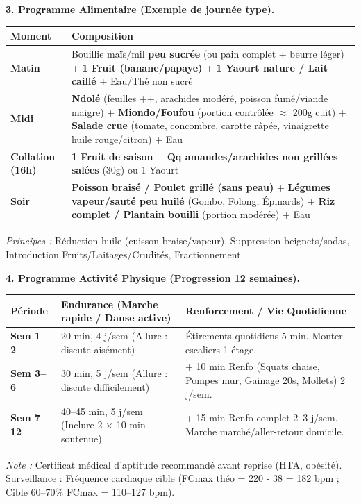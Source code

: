\documentclass[11pt]{article}
\begin{document}
\begin{exoresolu}
\textbf{3. Programme Alimentaire (Exemple de journée type).}
\begin{center}
\begin{tabularx}{\linewidth}{|l|X|}\hline
\rowcolor{popblueL} \textbf{Moment} & \textbf{Composition} \\ \hline
\textbf{Matin} & Bouillie maïs/mil \textbf{peu sucrée} (ou pain complet + beurre léger) + \textbf{1 Fruit (banane/papaye)} + \textbf{1 Yaourt nature / Lait caillé} + Eau/Thé non sucré \\ \hline
\textbf{Midi} & \textbf{Ndolé} (feuilles ++, arachides modéré, poisson fumé/viande maigre) + \textbf{Miondo/Foufou} (portion contrôlée $\approx$ 200g cuit) + \textbf{Salade crue} (tomate, concombre, carotte râpée, vinaigrette huile rouge/citron) + Eau \\ \hline
\textbf{Collation (16h)} & \textbf{1 Fruit de saison} + \textbf{Qq amandes/arachides non grillées salées} (30g) ou 1 Yaourt \\ \hline
\textbf{Soir} & \textbf{Poisson braisé / Poulet grillé (sans peau)} + \textbf{Légumes vapeur/sauté peu huilé} (Gombo, Folong, Épinards) + \textbf{Riz complet / Plantain bouilli} (portion modérée) + Eau \\ \hline
\end{tabularx}
\end{center}
\textit{Principes :} Réduction huile (cuisson braise/vapeur), Suppression beignets/sodas, Introduction Fruits/Laitages/Crudités, Fractionnement.

\textbf{4. Programme Activité Physique (Progression 12 semaines).}
\begin{center}
\begin{tabularx}{\linewidth}{|l|X|X|}\hline
\rowcolor{popblueL} \textbf{Période} & \textbf{Endurance (Marche rapide / Danse active)} & \textbf{Renforcement / Vie Quotidienne} \\ \hline
\textbf{Sem 1--2} & 20 min, 4 j/sem (Allure : discute aisément) & Étirements quotidiens 5 min. Monter escaliers 1 étage. \\ \hline
\textbf{Sem 3--6} & 30 min, 5 j/sem (Allure : discute difficilement) & + 10 min Renfo (Squats chaise, Pompes mur, Gainage 20s, Mollets) 2 j/sem. \\ \hline
\textbf{Sem 7--12} & 40--45 min, 5 j/sem (Inclure 2 $\times$ 10 min soutenue) & + 15 min Renfo complet 2--3 j/sem. Marche marché/aller-retour domicile. \\ \hline
\end{tabularx}
\end{center}
\textit{Note :} Certificat médical d'aptitude recommandé avant reprise (HTA, obésité). Surveillance : Fréquence cardiaque cible (FCmax théo = 220 - 38 = 182 bpm ; Cible 60--70\% FCmax = 110--127 bpm).


\end{exoresolu}
\end{document}
